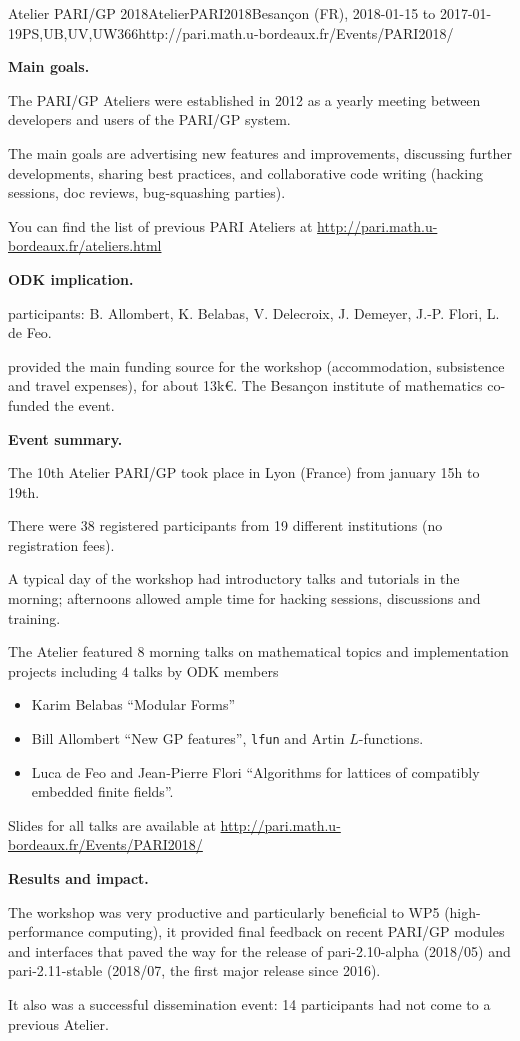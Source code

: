 \begin{event}{Atelier PARI/GP 2018}{AtelierPARI2018}{Besan\c{c}on (FR),
2018-01-15 to 2017-01-19}{PS,UB,UV,UW}{36}{6}{http://pari.math.u-bordeaux.fr/Events/PARI2018/}

\textbf{Main goals.}

The PARI/GP Ateliers were established in 2012 as a yearly meeting
between developers and users of the PARI/GP system.

The main goals are advertising new features and improvements,
discussing further developments, sharing best practices, and collaborative
code writing (hacking sessions, doc reviews, bug-squashing parties).

You can find the list of previous PARI Ateliers at
\url{http://pari.math.u-bordeaux.fr/ateliers.html}

\textbf{ODK implication.} 

\ODK participants: B. Allombert, K. Belabas, V. Delecroix, J. Demeyer,
J.-P. Flori, L. de Feo.

\ODK provided the main funding source for the workshop (accommodation,
subsistence and travel expenses), for about 13k\euro. The Besan\c{c}on
institute of mathematics co-funded the event.

\textbf{Event summary.} 

The 10th Atelier PARI/GP took place in Lyon (France) from january
15h to 19th.

There were 38 registered participants from 19 different institutions
(no registration fees).

A typical day of the workshop had introductory talks and tutorials
in the morning; afternoons allowed ample time for hacking sessions,
discussions and training.

The Atelier featured 8 morning talks on mathematical topics and
implementation projects including 4 talks by ODK members
\begin{itemize}
\item Karim Belabas ``Modular Forms''
\item Bill Allombert ``New GP features'', \texttt{lfun} and Artin
  $L$-functions.
\item Luca de Feo and Jean-Pierre Flori ``Algorithms for lattices of
  compatibly embedded finite fields''.
\end{itemize}

Slides for all talks are available at
\url{http://pari.math.u-bordeaux.fr/Events/PARI2018/}

\textbf{Results and impact.} 

The workshop was very productive and particularly beneficial to WP5
(high-performance computing), it provided final feedback on recent PARI/GP
  modules and interfaces that paved the way for the release of
  pari-2.10-alpha (2018/05) and pari-2.11-stable (2018/07, the first major
  release since 2016).
  
It also was a successful dissemination event: 14 participants had not come to
  a previous Atelier.
\end{event}
